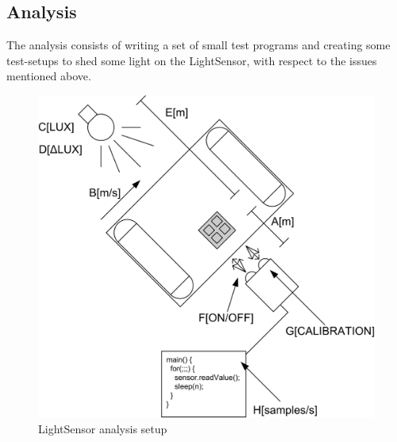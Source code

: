 \documentclass[11pt,a4]{article}
\begin{document}
\subsection{Analysis}
The analysis consists of writing a set of small test programs and creating some test-setups to shed some light on the LightSensor, with respect to the issues mentioned above. 
\begin{figure}[jpg]
\centering
\includegraphics{lightsensor_analysis}
\caption{LightSensor analysis setup}\label{fig:lightsensor_analysis}
\end{figure}
\end{document}
